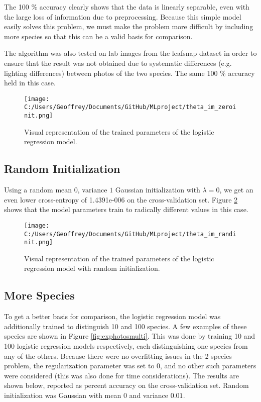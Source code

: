 \documentclass[12pt]{article}
\begin{document}
The 100 \% accuracy clearly shows that the data is linearly separable, even with the large loss of information due to preprocessing. Because this simple model easily solves this problem, we must make the problem more difficult by including more species so that this can be a valid basis for comparison.

The algorithm was also tested on lab images from the leafsnap dataset in order to ensure that the result was not obtained due to systematic differences (e.g. lighting differences) between photos of the two species. The same 100 \% accuracy held in this case.

\begin{figure}
\begin{center} 
 \texttt{[image: C:/Users/Geoffrey/Documents/GitHub/MLproject/theta\_im\_zeroinit.png]}
\end{center}
\caption{\label{fig:thetaZeroinitLogR} Visual representation of the trained parameters of the logistic regression model.}
\end{figure}

\subsection{Random Initialization} Using a random mean $0$, variance $1$ Gaussian initialization with $\lambda = 0$, we get an even lower cross-entropy of 1.4391e-006 on the cross-validation set. Figure \ref{fig:thetaRandinitLogR} shows that the model parameters train to radically different values in this case.

\begin{figure}
\begin{center}
 \texttt{[image: C:/Users/Geoffrey/Documents/GitHub/MLproject/theta\_im\_randinit.png]}
\end{center} 
\caption{\label{fig:thetaRandinitLogR} Visual representation of the trained parameters of the logistic regression model with random initialization.}
\end{figure}

\subsection{More Species} To get a better basis for comparison, the logistic regression model was additionally trained to distinguish 10 and 100 species. A few examples of these species are shown in Figure \ref{fig:exphotosmulti}. This was done by training 10 and 100 logistic regression models respectively, each distinguishing one species from any of the others. Because there were no overfitting issues in the 2 species problem, the regularization parameter was set to $0$, and no other such parameters were considered (this was also done for time considerations). The results are shown below, reported as percent accuracy on the cross-validation set. Random initialization was Gaussian with mean $0$ and variance $0.01$.
\end{document}

